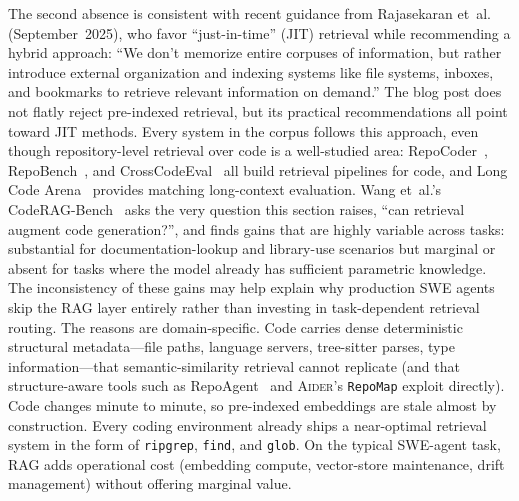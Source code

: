 \documentclass[11pt,a4paper]{article}
\newcommand{\adr}{\textsc{Aider}\xspace}
\begin{document}
The second absence is consistent with recent guidance from Rajasekaran et~al.~\cite{rajasekaran2025context} (September~2025), who favor ``just-in-time'' (JIT) retrieval while recommending a hybrid approach: ``We don't memorize entire corpuses of information, but rather introduce external organization and indexing systems like file systems, inboxes, and bookmarks to retrieve relevant information on demand.''
The blog post does not flatly reject pre-indexed retrieval, but its practical recommendations all point toward JIT methods.
Every system in the corpus follows this approach, even though repository-level retrieval over code is a well-studied area: RepoCoder~\cite{zhang2023repocoder}, RepoBench~\cite{liu2024repobench}, and CrossCodeEval~\cite{ding2023crosscodeeval} all build retrieval pipelines for code, and Long Code Arena~\cite{bogomolov2024longcodearena} provides matching long-context evaluation.
Wang et~al.'s CodeRAG-Bench~\cite{wang2025coderagbench} asks the very question this section raises, ``can retrieval augment code generation?'', and finds gains that are highly variable across tasks: substantial for documentation-lookup and library-use scenarios but marginal or absent for tasks where the model already has sufficient parametric knowledge. The inconsistency of these gains may help explain why production SWE agents skip the RAG layer entirely rather than investing in task-dependent retrieval routing.
The reasons are domain-specific.
Code carries dense deterministic structural metadata---file paths, language servers, tree-sitter parses, type information---that semantic-similarity retrieval cannot replicate (and that structure-aware tools such as RepoAgent~\cite{luo2024repoagent} and \adr{}'s \texttt{RepoMap} exploit directly).
Code changes minute to minute, so pre-indexed embeddings are stale almost by construction.
Every coding environment already ships a near-optimal retrieval system in the form of \texttt{ripgrep}, \texttt{find}, and \texttt{glob}.
On the typical SWE-agent task, RAG adds operational cost (embedding compute, vector-store maintenance, drift management) without offering marginal value.
\end{document}
